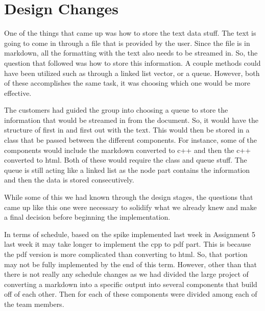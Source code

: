 \section{Design Changes}
One of the things that came up was how to store the text data stuff. The text is going to come in through a file that is provided by the user. Since the file is in markdown, all the formatting with the text also needs to be streamed in. So, the question that followed was how to store this information. A couple methods could have been utilized such as through a linked list vector, or a queue. However, both of these accomplishes the same task, it was choosing which one would be more effective. \newline 

\noindent The customers had guided the group into choosing a queue to store the information that would be streamed in from the document. So, it would have the structure of first in and first out with the text. This would then be stored in a class that be passed between the different components. For instance, some of the components would include the markdown converted to c++ and then the c++ converted to html. Both of these would require the class and queue stuff. The queue is still acting like a linked list as the node part contains the information and then the data is stored consecutively. \newline

\noindent While some of this we had known through the design stages, the questions that came up like this one were necessary to solidify what we already knew and make a final decision before beginning the implementation. \newline

\noindent In terms of schedule, based on the spike implemented last week in Assignment 5 last week it may take longer to implement the cpp to pdf part. This is because the pdf version is more complicated than converting to html. So, that portion may not be fully implemented by the end of this term. However, other than that there is not really any schedule changes as we had divided the large project of converting a markdown into a specific output into several components that build off of each other. Then for each of these components were divided among each of the team members. \newline
